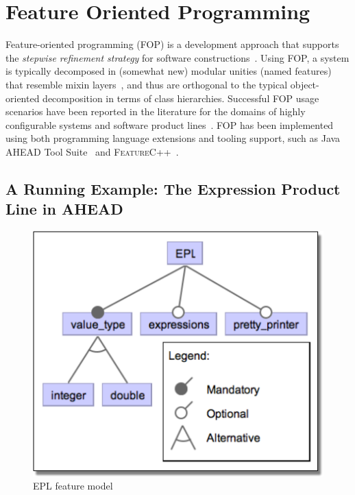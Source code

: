 \section{Feature Oriented Programming}\label{seq:fop}

Feature-oriented programming (FOP) is a development approach 
that supports the \emph{stepwise refinement strategy} for software 
constructions~\cite{batory-tse2004}. Using FOP, a system is 
typically decomposed in (somewhat new) %
modular unities 
(named features) that resemble mixin layers~\cite{bracha-ecoop1990}, 
and thus are orthogonal to the typical object-oriented 
decomposition in terms of class hierarchies. 
Successful FOP usage scenarios have been reported in the literature 
for the domains of highly configurable systems and
software product lines~\cite{apel-splbook}. %
FOP has been implemented using both programming 
language extensions and tooling support, such as 
Java AHEAD Tool Suite~\cite{batory_feature-oriented_2004} 
and \textsc{FeatureC++}~\cite{apel_featurec++:_2005}. 

\subsection{A Running Example: The Expression Product Line in AHEAD}

\begin{figure}
\centering
\includegraphics[scale=0.35]{doc/images/epl_fm}
\caption{EPL feature model} 
\label{fig:epl_fm}
\end{figure} 

